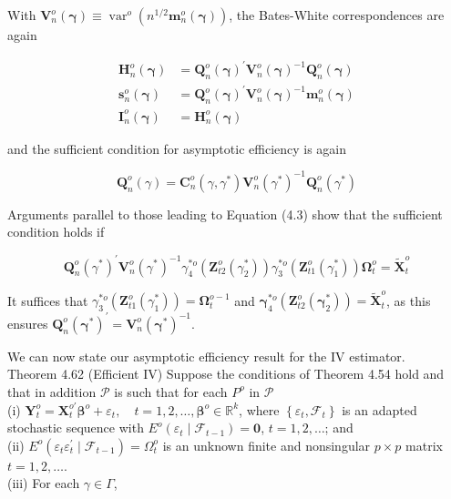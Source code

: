 \documentclass[10pt]{article}
\begin{document}
With $\mathbf{V}_{n}^{o}(\boldsymbol{\gamma}) \equiv \operatorname{var}^{o}\left(n^{1 / 2} \mathbf{m}_{n}^{o}(\boldsymbol{\gamma})\right)$, the Bates-White correspondences are again

$$
\begin{aligned}
\mathbf{H}_{n}^{o}(\boldsymbol{\gamma}) & =\mathbf{Q}_{n}^{o}(\boldsymbol{\gamma})^{\prime} \mathbf{V}_{n}^{o}(\boldsymbol{\gamma})^{-1} \mathbf{Q}_{n}^{o}(\boldsymbol{\gamma}) \\
\mathbf{s}_{n}^{o}(\boldsymbol{\gamma}) & =\mathbf{Q}_{n}^{o}(\boldsymbol{\gamma})^{\prime} \mathbf{V}_{n}^{o}(\boldsymbol{\gamma})^{-1} \mathbf{m}_{n}^{o}(\boldsymbol{\gamma}) \\
\mathbf{I}_{n}^{o}(\boldsymbol{\gamma}) & =\mathbf{H}_{n}^{o}(\boldsymbol{\gamma})
\end{aligned}
$$

and the sufficient condition for asymptotic efficiency is again

$$
\mathbf{Q}_{n}^{o}(\gamma)=\mathbf{C}_{n}^{o}\left(\gamma, \gamma^{*}\right) \mathbf{V}_{n}^{o}\left(\gamma^{*}\right)^{-1} \mathbf{Q}_{n}^{o}\left(\gamma^{*}\right)
$$

Arguments parallel to those leading to Equation (4.3) show that the sufficient condition holds if

$$
\mathbf{Q}_{n}^{o}\left(\gamma^{*}\right)^{\prime} \mathbf{V}_{n}^{o}\left(\gamma^{*}\right)^{-1} \gamma_{4}^{* o}\left(\mathbf{Z}_{t 2}^{o}\left(\gamma_{2}^{*}\right)\right) \gamma_{3}^{* o}\left(\mathbf{Z}_{t 1}^{o}\left(\gamma_{1}^{*}\right)\right) \boldsymbol{\Omega}_{t}^{o}=\tilde{\mathbf{X}}_{t}^{o}
$$

It suffices that $\gamma_{3}^{* o}\left(\mathbf{Z}_{t 1}^{o}\left(\gamma_{1}^{*}\right)\right)=\boldsymbol{\Omega}_{t}^{o-1}$ and $\boldsymbol{\gamma}_{4}^{* o}\left(\mathbf{Z}_{t 2}^{o}\left(\boldsymbol{\gamma}_{2}^{*}\right)\right)=\tilde{\mathbf{X}}_{t}^{o}$, as this ensures $\mathbf{Q}_{n}^{o}\left(\boldsymbol{\gamma}^{*}\right)^{\prime}=\mathbf{V}_{n}^{o}\left(\boldsymbol{\gamma}^{*}\right)^{-1}$.

We can now state our asymptotic efficiency result for the IV estimator.\\
Theorem 4.62 (Efficient IV) Suppose the conditions of Theorem 4.54 hold and that in addition $\mathcal{P}$ is such that for each $P^{o}$ in $\mathcal{P}$\\
(i) $\mathbf{Y}_{t}^{o}=\mathbf{X}_{t}^{o \prime} \boldsymbol{\beta}^{o}+\varepsilon_{t}, \quad t=1,2, \ldots, \boldsymbol{\beta}^{o} \in \mathbb{R}^{k}$, where $\left\{\varepsilon_{t}, \mathcal{F}_{t}\right\}$ is an adapted stochastic sequence with $E^{o}\left(\varepsilon_{t} \mid \mathcal{F}_{t-1}\right)=\mathbf{0}$, $t=1,2, \ldots$; and\\
(ii) $E^{o}\left(\varepsilon_{t} \varepsilon_{t}^{\prime} \mid \mathcal{F}_{t-1}\right)=\Omega_{t}^{o}$ is an unknown finite and nonsingular $p \times p$ matrix $t=1,2, \ldots$.\\
(iii) For each $\gamma \in \Gamma$,
\end{document}
